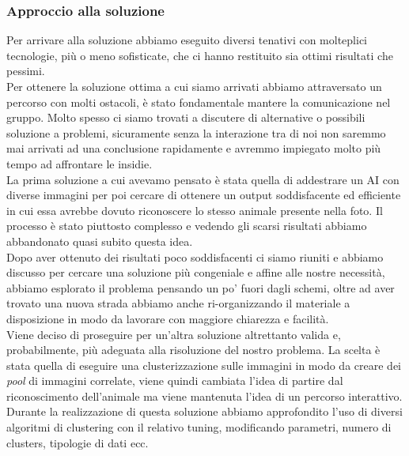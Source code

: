 \documentclass[12pt,a4paper,twoside]{article}
\begin{document}
\subsubsection{Approccio alla soluzione}
Per arrivare alla soluzione abbiamo eseguito diversi tenativi con molteplici tecnologie, più o 
meno sofisticate, che ci hanno restituito sia ottimi risultati che pessimi.\\
Per ottenere la soluzione ottima a cui siamo arrivati abbiamo attraversato un percorso con 
molti ostacoli, è stato fondamentale mantere la comunicazione nel gruppo. Molto spesso ci siamo 
trovati a discutere di alternative o possibili soluzione a problemi, sicuramente senza la 
interazione tra di noi non saremmo mai arrivati ad una conclusione rapidamente e avremmo 
impiegato molto più tempo ad affrontare le insidie.\\
La prima soluzione a cui avevamo pensato è stata quella di addestrare un AI con diverse immagini 
per poi cercare di ottenere un output soddisfacente ed efficiente in cui essa avrebbe dovuto 
riconoscere lo stesso animale presente nella foto. Il processo è stato piuttosto complesso e 
vedendo gli scarsi risultati abbiamo abbandonato quasi subito questa idea.\\
Dopo aver ottenuto dei risultati poco soddisfacenti ci siamo riuniti e abbiamo discusso per 
cercare una soluzione più congeniale e affine alle nostre necessità, abbiamo esplorato il 
problema pensando un po' fuori dagli schemi, oltre ad aver trovato una nuova strada abbiamo 
anche ri-organizzando il materiale a disposizione in modo da lavorare con maggiore chiarezza e 
facilità.\\
Viene deciso di proseguire per un'altra soluzione altrettanto valida e, probabilmente, più 
adeguata alla risoluzione del nostro problema. La scelta è stata quella di eseguire una 
clusterizzazione sulle immagini in modo da creare dei \textit{pool} di immagini correlate, 
viene quindi cambiata l'idea di partire dal riconoscimento dell'animale ma viene mantenuta 
l'idea di un percorso interattivo.\\
Durante la realizzazione di questa soluzione abbiamo approfondito l'uso di diversi algoritmi 
di clustering con il relativo tuning, modificando parametri, numero di clusters, tipologie di 
dati ecc.
\end{document}
